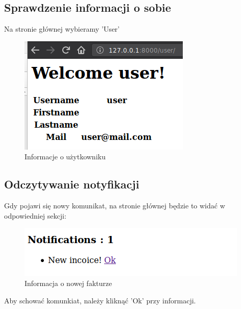\documentclass[12pt]{article}
\begin{document}
\subsection{Sprawdzenie informacji o sobie}
Na stronie głównej wybieramy 'User'
\begin{figure}[H]
	\centering
	\includegraphics[scale=0.7]{img/5.png}
	\caption{Informacje o użytkowniku}
\end{figure}
\subsection{Odczytywanie notyfikacji}
Gdy pojawi się nowy komunikat, na stronie głównej będzie to widać w odpowiedniej sekcji:
\begin{figure}[H]
	\centering
	\includegraphics[scale=0.7]{img/9.png}
	\caption{Informacja o nowej fakturze}
\end{figure}
Aby schować komunkiat, należy kliknąć 'Ok' przy informacji.
\end{document}
